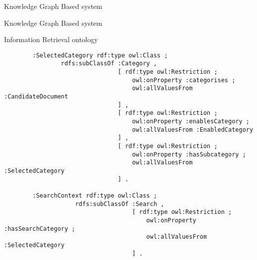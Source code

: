 \begin{frame}{Knowledge Graph Based system}
    

\end{frame}

\begin{frame}{Knowledge Graph Based system}
    

\end{frame}

\begin{frame}{Information Retrieval ontology}
    
    \begin{Verbatim}
        :SelectedCategory rdf:type owl:Class ;
                rdfs:subClassOf :Category ,
                                [ rdf:type owl:Restriction ;
                                    owl:onProperty :categorises ;
                                    owl:allValuesFrom :CandidateDocument
                                ] ,
                                [ rdf:type owl:Restriction ;
                                    owl:onProperty :enablesCategory ;
                                    owl:allValuesFrom :EnabledCategory
                                ] ,
                                [ rdf:type owl:Restriction ;
                                    owl:onProperty :hasSubcategory ;
                                    owl:allValuesFrom :SelectedCategory
                                ] .
    
        :SearchContext rdf:type owl:Class ;
                    rdfs:subClassOf :Search ,
                                    [ rdf:type owl:Restriction ;
                                        owl:onProperty :hasSearchCategory ;
                                        owl:allValuesFrom :SelectedCategory
                                    ] .
    \end{Verbatim}

\end{frame}